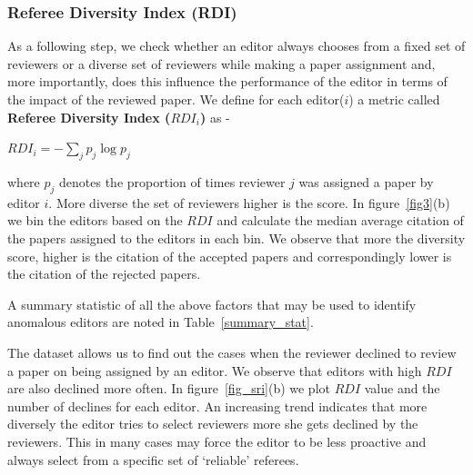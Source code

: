 \subsubsection{Referee Diversity Index (RDI)}
As a following step, we check whether an editor always chooses from a fixed set of reviewers or a diverse set of reviewers while making a paper assignment and, more importantly, does this influence the performance of the editor in terms of the impact of the reviewed paper. We define for each editor($i$) a metric called {\bf Referee Diversity Index ($RDI_{i}$)} as -  
\begin{center}
$RDI_{i}=-\sum \limits_{j} p_{j}\log p_{j}$
\end{center}
where $p_{j}$ denotes the proportion of times reviewer $j$ was assigned a paper by editor $i$. More diverse the set of reviewers higher is the score. In figure~\ref{fig3}(b) we bin the editors based on the $RDI$ and calculate the median average citation of the papers assigned to the editors in each bin. We observe that more the diversity score, higher is the citation of the accepted papers and correspondingly lower is the citation of the rejected papers.

A summary statistic of all the above factors that may be used to identify anomalous editors are noted in Table~\ref{summary_stat}.

The dataset allows us to find out the cases when the reviewer declined to review a paper on being assigned by an editor. We observe that editors with high $RDI$ are also declined more often. In figure~\ref{fig_sri}(b) we plot $RDI$ value and the number of declines for each editor. An increasing trend indicates that more diversely the editor tries to select reviewers more she gets declined by the reviewers. This in many cases may force the editor to be less proactive and always select from a specific set of `reliable' referees.  


